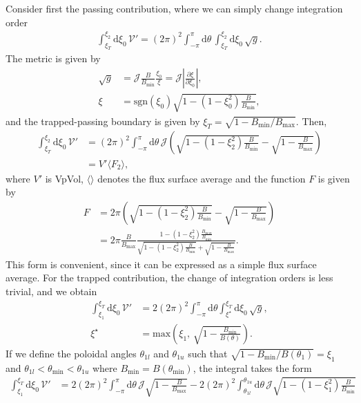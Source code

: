 \documentclass[11pt,a4paper]{article}
\newcommand{\rd}{\ensuremath{\mathrm{d}}}
\newcommand{\sub}[1]{\ensuremath{_{\text{#1}}}}
\begin{document}
Consider first the passing contribution, where we can simply change integration order
\begin{align}
\int_{\xi_T}^{\xi_2} \rd \xi_0 \, \mathcal{V}' = (2\pi)^2 \int_{-\pi}^\pi \rd \theta \, \int_{\xi_T}^{\xi_2} \rd \xi_0 \, \sqrt{g}.
\end{align}
The metric is given by
\begin{align}
\sqrt{g} &= \mathcal{J}\frac{B}{B\sub{min}}\frac{\xi_0}{\xi} = \mathcal{J}\left|\frac{\partial \xi}{\partial \xi_0}\right|, \\
\xi &= \text{sgn}(\xi_0)\sqrt{1-(1-\xi_0^2)\frac{B}{B\sub{min}}},
\end{align}
and the trapped-passing boundary is given by $\xi_T = \sqrt{1-B\sub{min}/B\sub{max}}$. Then,
\begin{align}
\int_{\xi_T}^{\xi_2} \rd \xi_0 \, \mathcal{V}' &= (2\pi)^2 \int_{-\pi}^{\pi} \rd \theta \, \mathcal{J} \left( \sqrt{ 1 - (1-\xi_2^2)\frac{B}{B\sub{min}}} - \sqrt{1-\frac{B}{B\sub{max}}}  \right) \nonumber \\
&= V' \langle F_2\rangle,
\end{align}
where $V'$ is VpVol, $\langle \rangle$ denotes the flux surface average and the function $F$ is given by
\begin{align}
F &= 2\pi \left( \sqrt{ 1 - (1-\xi_2^2)\frac{B}{B\sub{min}}} - \sqrt{1-\frac{B}{B\sub{max}}} \right) \nonumber \\
&= 2\pi \frac{B}{B\sub{max}} \frac{ 1 - (1-\xi_2^2)\frac{B\sub{max}}{B\sub{min}} }{ \sqrt{ 1 - (1-\xi_2^2)\frac{B}{B\sub{min}}} + \sqrt{1-\frac{B}{B\sub{max}}} }.
\end{align}
This form is convenient, since it can be expressed as a simple flux surface average. For the trapped contribution, the change of integration orders is less trivial, and we obtain
\begin{align}
\int_{\xi_1}^{\xi_T}\rd\xi_0 \,\mathcal{V}' &= 2(2\pi)^2 \int_{-\pi}^\pi \rd \theta \int_{\xi^\star}^{\xi_T} \rd \xi_0\, \sqrt{g}, \nonumber \\
\xi^\star &= \text{max}\left(\xi_1, \, \sqrt{1-\frac{B\sub{min}}{B(\theta)}}\right).
\end{align}
If we define the poloidal angles $\theta_{1l}$ and $\theta_{1u}$ such that $\sqrt{1-B\sub{min}/B(\theta_1)} = \xi_1$ and $\theta_{1l} < \theta\sub{min} < \theta_{1u}$ where $B\sub{min} = B(\theta\sub{min})$, the integral takes the form
\begin{align}
\int_{\xi_1}^{\xi_T}\rd\xi_0 \,\mathcal{V}' &=  2(2\pi)^2 \int_{-\pi}^\pi \rd \theta \,\mathcal{J}\sqrt{1-\frac{B}{B\sub{max}}} - 2(2\pi)^2 \int_{\theta_{1l}}^{\theta_{1u}}\rd \theta \, \mathcal{J}\sqrt{ 1 - (1-\xi_1^2)\frac{B}{B\sub{min}}}
\end{align}
\end{document}
